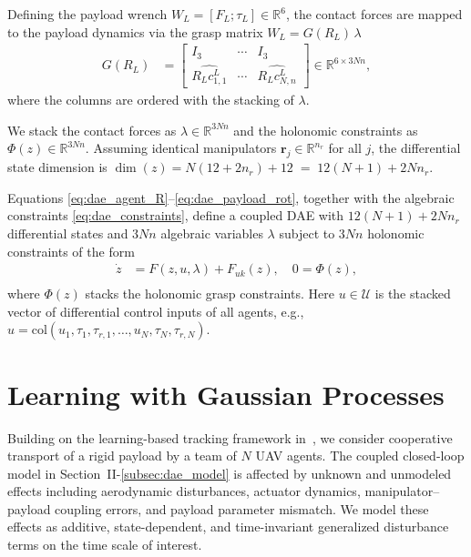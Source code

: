 \documentclass[letterpaper, 10 pt, conference]{ieeeconf}  %
\newcommand{\0}{\matr{0}}
\begin{document}
Defining the payload wrench $W_L=[F_L;\tau_L]\in\mathbb R^6$, the contact forces are mapped
to the payload dynamics via the grasp matrix $W_L = G(R_L)\,\lambda$
\begin{align*}
G(R_L)&=
\begin{bmatrix}
I_3 & \cdots & I_3\\
\widehat{R_L c^L_{1,1}} & \cdots & \widehat{R_L c^L_{N,n}}
\end{bmatrix}
\in\mathbb R^{6\times 3Nn},
\end{align*}
where the columns are ordered with the stacking of $\lambda$.

We stack the contact forces as $\lambda\in\mathbb R^{3Nn}$ and the holonomic constraints as
$\Phi(z)\in\mathbb R^{3Nn}$.
Assuming identical manipulators $\mathbf r_j\in\mathbb R^{n_r}$ for all $j$, the differential
state dimension is $\dim(z)= N(12+2n_r)+12 \;=\; 12(N+1)+2Nn_r$.

Equations \eqref{eq:dae_agent_R}--\eqref{eq:dae_payload_rot}, together with the algebraic
constraints \eqref{eq:dae_constraints}, define a coupled DAE with $12(N+1)+2Nn_r$ differential
states and $3Nn$ algebraic variables $\lambda$ subject to $3Nn$ holonomic constraints of the form
\begin{equation}\label{eq:dae_compact}
\begin{aligned}
\dot z &= F(z,u,\lambda) + F_{uk}(z),\quad 0= \Phi(z),\\
\end{aligned}
\end{equation}
where $\Phi(z)$ stacks the holonomic grasp constraints. Here $u\in\mathcal U$ is the stacked vector of differential control inputs of all agents,
e.g., $u=\mathrm{col}(u_1,\tau_1,\tau_{r,1},\ldots,u_N,\tau_N,\tau_{r,N})$.



\section{Learning with Gaussian Processes}
\label{sec:learning}

Building on the learning-based tracking framework in~\cite{YagoColomboArms}, we consider cooperative transport of a rigid payload
by a team of $N$ UAV agents. The coupled closed-loop model in Section~II-\ref{subsec:dae_model} is affected by unknown and unmodeled
effects including aerodynamic disturbances, actuator dynamics, manipulator--payload coupling errors, and payload parameter mismatch.
We model these effects as additive, state-dependent, and time-invariant generalized disturbance terms on the time scale of interest.
\end{document}
